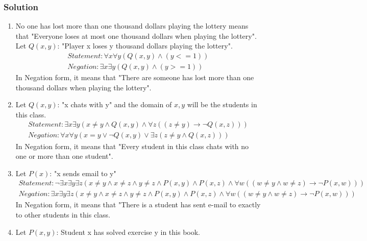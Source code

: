 \documentclass{article}
\begin{document}
\subsubsection*{Solution}
\begin{enumerate} [label = (\alph*)]
    \item No one has lost more than one thousand dollars playing the lottery means that "Everyone loses at most one thousand dollars when playing the lottery". Let $Q(x, y)$: "Player x loses y thousand dollars playing the lottery".
          \begin{align}
              Statement: \forall x\forall y(Q(x, y) \land (y <= 1)) \nonumber \\
              Negation: \exists x\exists y(Q(x, y) \land (y >= 1))  \nonumber
          \end{align}
          In Negation form, it means that "There are someone has lost more than one thousand dollars when playing the lottery".
    \item Let $Q(x, y)$: "x chats with y" and the domain of $x, y$ will be the students in this class.
          \begin{align}
              Statement: \exists x\exists y(x \ne y \land Q(x, y) \land \forall z((z \ne y) \rightarrow \lnot Q(x, z))) \nonumber \\
              Negation: \forall x \forall y(x = y \lor \lnot Q(x, y) \lor \exists z(z \ne y \land Q(x, z)) )\nonumber
          \end{align}
          In Negation form, it means that "Every student in this class chats with no one or more than one student".
    \item Let $P(x)$: "x sends email to y"
          \begin{align}
              Statement: \lnot \exists x\exists y \exists z(x \ne y \land x \ne z \land y \ne z \land P(x, y) \land P(x, z) \land \forall w((w \ne y \land w \ne z) \rightarrow \lnot P(x, w))) \nonumber \\
              Negation: \exists x\exists y \exists z(x \ne y \land x \ne z \land y \ne z \land P(x, y) \land P(x, z) \land \forall w((w \ne y \land w \ne z) \rightarrow \lnot P(x, w))) \nonumber
          \end{align}
          In Negation form, it means that "There is a student has sent e-mail to exactly to other students in this class.
    \item Let $P(x, y)$: Student x has solved exercise y in this book.
          \begin{align}

\end{align}
\end{enumerate}
\end{document}
